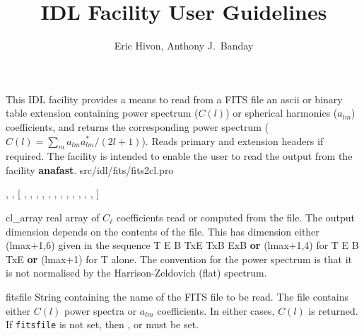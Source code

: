 

\sloppy

\title{\healpix IDL Facility User Guidelines}
 \section[fits2cl]{ }
\label{idl:fits2cl}
\author{Eric Hivon, Anthony J.~Banday}

\begin{facility}
{This IDL facility provides a means to
read from a FITS file an ascii or binary table extension containing power 
spectrum ($C(l)$) or spherical harmonics ($a_{l m}$) coefficients, and returns
the corresponding power spectrum ($C(l) = \sum_m a_{lm}a^*_{lm} / (2l+1)$). Reads primary and extension headers if
required. The facility is intended to enable the user to read the
output from the \healpix facility \textbf{anafast}.
}
{src/idl/fits/fits2cl.pro}
\end{facility}

\begin{IDLformat}
{\thedocid, 
, 
[%
, %
 ,
, 
, 
, 
,  
, 
, 
, 
, 
, 
, 
%
]}
\end{IDLformat}

\begin{qualifiers}
  \begin{qulist}{} %
    \item[cl\_array] %
      real array of $C_\ell$ coefficients read or computed from the
      file. The output dimension depends on the contents of the file. 
	This has dimension either (lmax+1,6) given in the sequence T E B
      TxE TxB ExB {\bf or} (lmax+1,4) for T E B TxE {\bf or} (lmax+1) for T
    alone. 
     The convention for the power spectrum is that it is not
      normalised by the Harrison-Zeldovich (flat) spectrum.
%
    \item[fitsfile] %
    String containing the name of the FITS file to be read. The
    file contains either $C(l)$ power spectra or $a_{l m}$ coefficients. In either
    cases, $C(l)$ is returned. If {\tt fitsfile} is not set, then
,
 or
must be set.
  \end{qulist}
\end{qualifiers}

